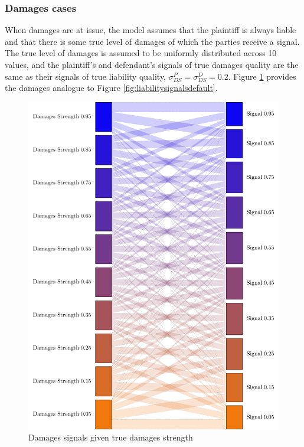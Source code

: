 \documentclass{article}
\begin{document}
\subsubsection{Damages cases}

When damages are at issue, the model assumes that the plaintiff is always liable and that there is some true level of damages of which the parties receive a signal. The true level of damages is assumed to be uniformly distributed across 10 values, and the plaintiff's and defendant's signals of true damages quality are the same as their signals of true liability quality, $\sigma_{DS}^P=\sigma_{DS}^D=0.2$. Figure \ref{fig:damagessignals} provides the damages analogue to Figure \ref{fig:liabilitysignalsdefault}.

\begin{figure}[h!]
\centering
\includegraphics[scale=0.4, trim={0in 0in 0in 0in}, clip]{../Figures/damages signals.pdf}
\caption{Damages signals given true damages strength}
\label{fig:damagessignals}
\end{figure}
\end{document}
